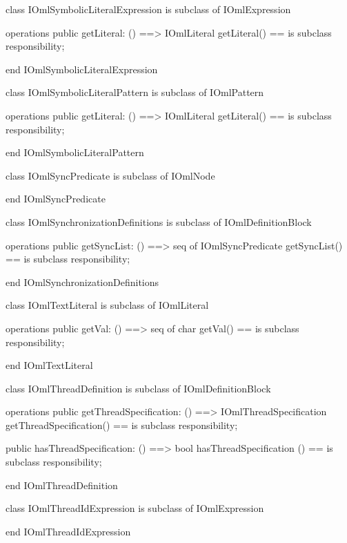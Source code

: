 \begin{vdm_al}
class IOmlSymbolicLiteralExpression
 is subclass of IOmlExpression

operations
  public getLiteral: () ==> IOmlLiteral
  getLiteral() == is subclass responsibility;

end IOmlSymbolicLiteralExpression
\end{vdm_al}

\begin{vdm_al}
class IOmlSymbolicLiteralPattern
 is subclass of IOmlPattern

operations
  public getLiteral: () ==> IOmlLiteral
  getLiteral() == is subclass responsibility;

end IOmlSymbolicLiteralPattern
\end{vdm_al}

\begin{vdm_al}
class IOmlSyncPredicate
 is subclass of IOmlNode

end IOmlSyncPredicate
\end{vdm_al}

\begin{vdm_al}
class IOmlSynchronizationDefinitions
 is subclass of IOmlDefinitionBlock

operations
  public getSyncList: () ==> seq of IOmlSyncPredicate
  getSyncList() == is subclass responsibility;

end IOmlSynchronizationDefinitions
\end{vdm_al}

\begin{vdm_al}
class IOmlTextLiteral
 is subclass of IOmlLiteral

operations
  public getVal: () ==> seq of char
  getVal() == is subclass responsibility;

end IOmlTextLiteral
\end{vdm_al}

\begin{vdm_al}
class IOmlThreadDefinition
 is subclass of IOmlDefinitionBlock

operations
  public getThreadSpecification: () ==> IOmlThreadSpecification
  getThreadSpecification() == is subclass responsibility;

  public hasThreadSpecification: () ==> bool
  hasThreadSpecification () == is subclass responsibility;

end IOmlThreadDefinition
\end{vdm_al}

\begin{vdm_al}
class IOmlThreadIdExpression
 is subclass of IOmlExpression

end IOmlThreadIdExpression
\end{vdm_al}

